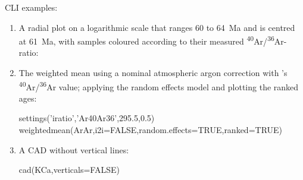 \begin{refsection}
\noindent CLI examples:

\begin{enumerate}

\item A radial plot on a logarithmic scale that ranges 60 to 64~Ma and
  is centred at 61~Ma, with samples coloured according to their
  measured \textsuperscript{40}Ar/\textsuperscript{36}Ar-ratio:


\item The weighted mean using a nominal atmospheric argon correction
  with \citet{nier1950}'s
  \textsuperscript{40}Ar/\textsuperscript{36}Ar value; applying the
  random effects model and plotting the ranked ages:
  
\begin{script}
settings('iratio','Ar40Ar36',295.5,0.5)
weightedmean(ArAr,i2i=FALSE,random.effects=TRUE,ranked=TRUE)
\end{script}

\item A CAD without vertical lines:

\begin{console}
cad(KCa,verticals=FALSE)
\end{console}
  
\end{enumerate}

\printbibliography[heading=subbibliography]

\end{refsection}
